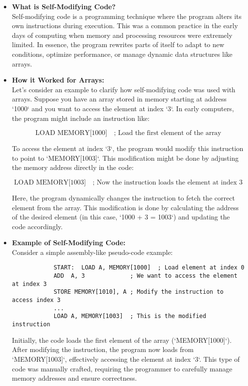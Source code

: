 \documentclass[12pt, oneside]{book}
\begin{document}
	\begin{itemize}
		\item \textbf{What is Self-Modifying Code?} \\
		Self-modifying code is a programming technique where the program alters its own instructions during execution. This was a common practice in the early days of computing when memory and processing resources were extremely limited. In essence, the program rewrites parts of itself to adapt to new conditions, optimize performance, or manage dynamic data structures like arrays.
		
		\item \textbf{How it Worked for Arrays:} \\
		Let's consider an example to clarify how self-modifying code was used with arrays. Suppose you have an array stored in memory starting at address `1000` and you want to access the element at index `3`. In early computers, the program might include an instruction like:
		
		\[
		\text{LOAD } \text{MEMORY[1000]} \quad \text{; Load the first element of the array}
		\]
		
		To access the element at index `3`, the program would modify this instruction to point to `MEMORY[1003]`. This modification might be done by adjusting the memory address directly in the code:
		
		\[
		\text{LOAD } \text{MEMORY[1003]} \quad \text{; Now the instruction loads the element at index 3}
		\]
		
		Here, the program dynamically changes the instruction to fetch the correct element from the array. This modification is done by calculating the address of the desired element (in this case, `1000 + 3 = 1003`) and updating the code accordingly.
		
		\item \textbf{Example of Self-Modifying Code:} \\
		Consider a simple assembly-like pseudo-code example:
		\begin{verbatim}
			START:  LOAD A, MEMORY[1000]  ; Load element at index 0
			ADD  A, 3             ; We want to access the element at index 3
			STORE MEMORY[1010], A ; Modify the instruction to access index 3
			...
			LOAD A, MEMORY[1003]  ; This is the modified instruction
		\end{verbatim}
		
		Initially, the code loads the first element of the array (`MEMORY[1000]`). After modifying the instruction, the program now loads from `MEMORY[1003]`, effectively accessing the element at index `3`. This type of code was manually crafted, requiring the programmer to carefully manage memory addresses and ensure correctness.
		

\end{itemize}
\end{document}
